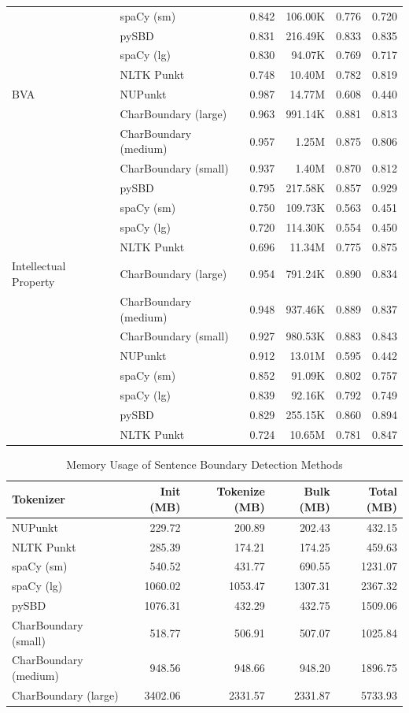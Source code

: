 \begin{table}[h!]
\begin{tabular}{llrrrr}
 & spaCy (sm) & 0.842 & 106.00K & 0.776 & 0.720 \\
 & pySBD & 0.831 & 216.49K & 0.833 & 0.835 \\
 & spaCy (lg) & 0.830 & 94.07K & 0.769 & 0.717 \\
 & NLTK Punkt & 0.748 & 10.40M & 0.782 & 0.819 \\
\midrule
BVA & NUPunkt & 0.987 & 14.77M & 0.608 & 0.440 \\
 & CharBoundary (large) & 0.963 & 991.14K & 0.881 & 0.813 \\
 & CharBoundary (medium) & 0.957 & 1.25M & 0.875 & 0.806 \\
 & CharBoundary (small) & 0.937 & 1.40M & 0.870 & 0.812 \\
 & pySBD & 0.795 & 217.58K & 0.857 & 0.929 \\
 & spaCy (sm) & 0.750 & 109.73K & 0.563 & 0.451 \\
 & spaCy (lg) & 0.720 & 114.30K & 0.554 & 0.450 \\
 & NLTK Punkt & 0.696 & 11.34M & 0.775 & 0.875 \\
\midrule
Intellectual Property & CharBoundary (large) & 0.954 & 791.24K & 0.890 & 0.834 \\
 & CharBoundary (medium) & 0.948 & 937.46K & 0.889 & 0.837 \\
 & CharBoundary (small) & 0.927 & 980.53K & 0.883 & 0.843 \\
 & NUPunkt & 0.912 & 13.01M & 0.595 & 0.442 \\
 & spaCy (sm) & 0.852 & 91.09K & 0.802 & 0.757 \\
 & spaCy (lg) & 0.839 & 92.16K & 0.792 & 0.749 \\
 & pySBD & 0.829 & 255.15K & 0.860 & 0.894 \\
 & NLTK Punkt & 0.724 & 10.65M & 0.781 & 0.847 \\
\bottomrule
\end{tabular}
\end{table}

\begin{table}[h!]
\centering
\caption{Memory Usage of Sentence Boundary Detection Methods}
\label{tab:memory-usage}
\begin{tabular}{lrrrr}
\toprule
\textbf{Tokenizer} & \textbf{Init (MB)} & \textbf{Tokenize (MB)} & \textbf{Bulk (MB)} & \textbf{Total (MB)} \\
\midrule
NUPunkt & 229.72 & 200.89 & 202.43 & 432.15 \\
NLTK Punkt & 285.39 & 174.21 & 174.25 & 459.63 \\
spaCy (sm) & 540.52 & 431.77 & 690.55 & 1231.07 \\
spaCy (lg) & 1060.02 & 1053.47 & 1307.31 & 2367.32 \\
pySBD & 1076.31 & 432.29 & 432.75 & 1509.06 \\
CharBoundary (small) & 518.77 & 506.91 & 507.07 & 1025.84 \\
CharBoundary (medium) & 948.56 & 948.66 & 948.20 & 1896.75 \\
CharBoundary (large) & 3402.06 & 2331.57 & 2331.87 & 5733.93 \\
\bottomrule
\end{tabular}
\end{table}

